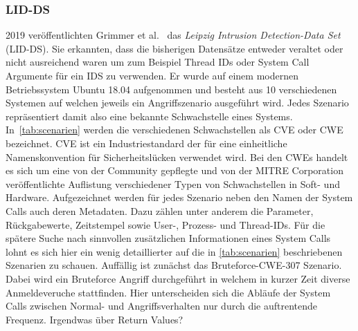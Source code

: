             \subsubsection{LID-DS}
                2019 veröffentlichten Grimmer et al.~\cite{LIDDS} das \textit{Leipzig Intrusion Detection-Data Set} (LID-DS).
                Sie erkannten, dass die bisherigen Datensätze entweder veraltet oder nicht ausreichend waren um zum Beispiel Thread IDs oder System Call Argumente für ein IDS zu verwenden.
                Er wurde auf einem modernen Betriebssystem Ubuntu 18.04 aufgenommen und besteht aus 10 verschiedenen Systemen auf welchen jeweils ein Angriffszenario ausgeführt wird.
                Jedes Szenario repräsentiert damit also eine bekannte Schwachstelle eines Systems.
                In~\autoref{tab:scenarien} werden die verschiedenen Schwachstellen als \ac{CVE}
                 oder \ac{CWE}  bezeichnet.
                CVE ist ein Industriestandard der für eine einheitliche Namenskonvention für Sicherheitslücken verwendet wird.
                Bei den CWEs handelt es sich um eine von der Community gepflegte und von der MITRE Corporation veröffentlichte Auflistung verschiedener Typen von Schwachstellen in Soft- und Hardware.
                Aufgezeichnet werden für jedes Szenario neben den Namen der System Calls auch deren Metadaten.
                Dazu zählen unter anderem die Parameter, Rückgabewerte, Zeitstempel sowie User-, Prozess- und Thread-IDs.
                Für die spätere Suche nach sinnvollen zusätzlichen Informationen eines System Calls lohnt es sich hier ein wenig detaillierter auf die in \autoref{tab:scenarien} beschriebenen Szenarien zu schauen.
                Auffällig ist zunächst das Bruteforce-CWE-307 Szenario.
                Dabei wird ein Bruteforce Angriff durchgeführt in welchem in kurzer Zeit diverse Anmeldeveruche stattfinden.
                Hier unterscheiden sich die Abläufe der System Calls zwischen Normal- und Angriffsverhalten nur durch die auftrentende Frequenz.
                {\color{red}Irgendwas über Return Values?}
